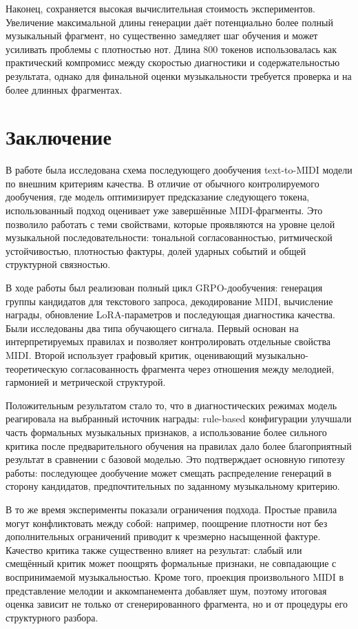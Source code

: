 \documentclass[a4paper,12pt]{extarticle}
\begin{document}
Наконец, сохраняется высокая вычислительная стоимость экспериментов.
Увеличение максимальной длины генерации даёт потенциально более полный
музыкальный фрагмент, но существенно замедляет шаг обучения и может усиливать
проблемы с плотностью нот. Длина 800 токенов использовалась как практический
компромисс между скоростью диагностики и содержательностью результата, однако
для финальной оценки музыкальности требуется проверка и на более длинных
фрагментах.

\section{Заключение}

В работе была исследована схема последующего дообучения text-to-MIDI модели
по внешним критериям качества. В отличие от обычного контролируемого
дообучения, где модель оптимизирует предсказание следующего токена,
использованный подход оценивает уже завершённые MIDI-фрагменты. Это позволило
работать с теми свойствами, которые проявляются на уровне целой музыкальной
последовательности: тональной согласованностью, ритмической устойчивостью,
плотностью фактуры, долей ударных событий и общей структурной связностью.

В ходе работы был реализован полный цикл GRPO-дообучения: генерация группы
кандидатов для текстового запроса, декодирование MIDI, вычисление награды,
обновление LoRA-параметров и последующая диагностика качества. Были
исследованы два типа обучающего сигнала. Первый основан на интерпретируемых
правилах и позволяет контролировать отдельные свойства MIDI. Второй использует
графовый критик, оценивающий музыкально-теоретическую согласованность
фрагмента через отношения между мелодией, гармонией и метрической структурой.

Положительным результатом стало то, что в диагностических режимах модель
реагировала на выбранный источник награды: rule-based конфигурации улучшали
часть формальных музыкальных признаков, а использование более сильного
критика после предварительного обучения на правилах дало более благоприятный
результат в сравнении с базовой моделью. Это подтверждает основную гипотезу
работы: последующее дообучение может смещать распределение генераций в сторону
кандидатов, предпочтительных по заданному музыкальному критерию.

В то же время эксперименты показали ограничения подхода. Простые правила
могут конфликтовать между собой: например, поощрение плотности нот без
дополнительных ограничений приводит к чрезмерно насыщенной фактуре. Качество
критика также существенно влияет на результат: слабый или смещённый критик
может поощрять формальные признаки, не совпадающие с воспринимаемой
музыкальностью. Кроме того, проекция произвольного MIDI в представление
мелодии и аккомпанемента добавляет шум, поэтому итоговая оценка зависит не
только от сгенерированного фрагмента, но и от процедуры его структурного
разбора.
\end{document}
